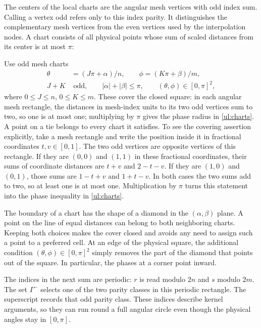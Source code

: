 The centers of the local charts are the angular mesh vertices with
odd index sum.  Calling a vertex odd refers only to this index parity.
It distinguishes the complementary mesh vertices from the even
vertices used by the interpolation nodes.  A chart consists of all
physical points whose sum of scaled distances from its center is at
most $\pi$:

Use odd mesh charts
\begin{equation}\label{ul:charts}
 \begin{aligned}
 \theta&=(J\pi+\alpha)/n,\qquad \phi=(K\pi+\beta)/m,\\
 J+K&\text{ odd},\qquad |\alpha|+|\beta|\leq\pi,
       \qquad (\theta,\phi)\in[0,\pi]^2,
 \end{aligned}
\end{equation}
where $0\leq J\leq n$, $0\leq K\leq m$.  These cover the closed
square: in each angular mesh rectangle, the distances in mesh-index units to its
two odd vertices sum to two, so one is at most one; multiplying by
$\pi$ gives the phase radius in \eqref{ul:charts}.  A point on a tie belongs to every chart it satisfies.
To see the covering assertion explicitly, take a mesh rectangle and
write the position inside it in fractional coordinates $t,v\in[0,1]$.
The two odd vertices are opposite vertices of this rectangle.  If they
are $(0,0)$ and $(1,1)$ in these fractional coordinates, their sums of
coordinate distances are $t+v$ and $2-t-v$.  If they are $(1,0)$ and
$(0,1)$, those sums are $1-t+v$ and $1+t-v$.  In both cases the two
sums add to two, so at least one is at most one.  Multiplication by
$\pi$ turns this statement into the phase inequality in
\eqref{ul:charts}.

The boundary of a chart has the shape of a diamond in the
$(\alpha,\beta)$ plane.  A point on the line of equal distances can
belong to both neighboring charts.  Keeping both choices makes the
cover closed and avoids any need to assign such a point to a preferred
cell.  At an edge of the physical square, the additional condition
$(\theta,\phi)\in[0,\pi]^2$ simply removes the part of the diamond
that points out of the square.  In particular, the phases at a corner
point inward.

The indices in the next sum are periodic: $r$ is read modulo $2n$
and $s$ modulo $2m$.  The set $\Gamma^-$ selects one of the two
parity classes in this periodic rectangle.  The superscript records
that odd parity class.  These indices describe kernel arguments, so
they can run round a full angular circle even though the physical
angles stay in $[0,\pi]$.

